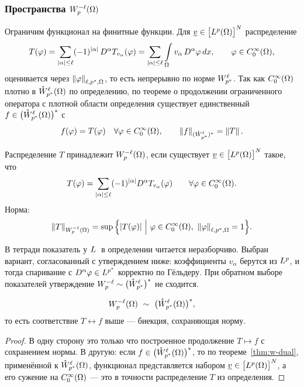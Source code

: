\subsubsection*{Пространства $W_{p}^{-\ell}(\Omega)$}

Ограничим функционал на финитные функции. Для $\underline v \in \big[L^{p}(\Omega)\big]^N$
распределение
\[
  T(\varphi) = \sum_{|\alpha| \le \ell} (-1)^{|\alpha|}\, D^\alpha T_{v_\alpha}(\varphi)
  = \sum_{|\alpha| \le \ell} \int\limits_\Omega v_\alpha\, D^\alpha \varphi\, dx ,
  \qquad \varphi \in C_0^\infty(\Omega) ,
\]
оценивается через $\left\lVert \varphi \right\rVert_{\ell,p^*,\Omega}$, то есть непрерывно по норме
$W_{p^*}^{\ell}$. Так как $C_0^\infty(\Omega)$ плотно в $\mathring{W}_{p^*}^{\ell}(\Omega)$ по определению,
по теореме о продолжении ограниченного оператора с плотной области определения существует
единственный $f \in \big(\mathring{W}_{p^*}^{\ell}(\Omega)\big)^*$ с
\[
  f(\varphi) = T(\varphi) \quad \forall \varphi \in C_0^\infty(\Omega) ,
  \qquad
  \left\lVert f \right\rVert_{(\mathring{W}_{p^*}^{\ell})^*} = \left\lVert T \right\rVert .
\]

\begin{definition}
Распределение $T$ принадлежит $W_{p}^{-\ell}(\Omega)$, если существует
$\underline v \in \big[L^{p}(\Omega)\big]^N$ такое, что
\[
  T(\varphi) = \sum_{|\alpha| \le \ell} (-1)^{|\alpha|} D^\alpha T_{v_\alpha}(\varphi)
  \qquad \forall \varphi \in C_0^\infty(\Omega) .
\]
Норма:
\[
  \norm{T}_{\Wp{p}{-\ell}(\Om)}
  = \sup \Big\{ |T(\varphi)| \ \Big|\ \varphi \in C_0^\infty(\Om),\ \norm{\varphi}_{\ell,p^*,\Om} = 1 \Big\} .
\]
\end{definition}

\begin{warn}
В тетради показатель у $L^{\;}$ в определении читается неразборчиво. Выбран вариант,
согласованный с утверждением ниже: коэффициенты $v_\alpha$ берутся из $L^{p}$, и тогда
спаривание с $D^\alpha\varphi \in L^{p^*}$ корректно по Гёльдеру. При обратном выборе
показателей утверждение $W_{p}^{-\ell} \sim \big(\mathring{W}_{p^*}^{\ell}\big)^*$ не сходится.
\end{warn}

\begin{proposition}
\[
  \Wp{p}{-\ell}(\Om) \ \sim\ \big(\Wpz{p^*}{\ell}(\Om)\big)^* ,
\]
то есть соответствие $T \leftrightarrow f$ выше — биекция, сохраняющая норму.
\end{proposition}

\begin{proof}
В одну сторону это только что построенное продолжение $T \mapsto f$ с сохранением нормы.
В другую: если $f \in \big(\mathring{W}_{p^*}^{\ell}(\Omega)\big)^*$, то по теореме~\ref{thm:w-dual},
применённой к $\mathring{W}_{p^*}^{\ell}(\Omega)$, функционал представляется набором
$\underline v \in \big[L^{p}(\Omega)\big]^N$, а его сужение на $C_0^\infty(\Omega)$ — это
в точности распределение $T$ из определения.
\end{proof}

